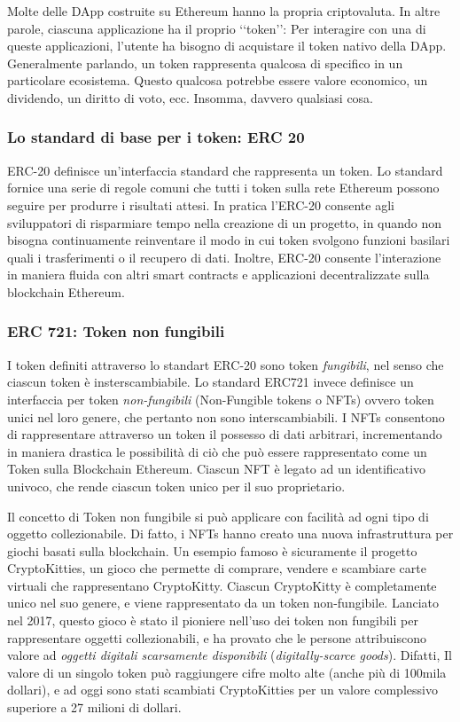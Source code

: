 Molte delle DApp costruite su Ethereum hanno la propria criptovaluta. In altre parole, ciascuna applicazione ha il proprio ‘‘token’’: Per interagire con una di queste applicazioni, l'utente ha bisogno di acquistare il token nativo della DApp. Generalmente parlando, un token rappresenta qualcosa di specifico in un particolare ecosistema. Questo qualcosa potrebbe essere valore economico, un dividendo, un diritto di voto, ecc. Insomma, davvero qualsiasi cosa.

\subsubsection{Lo standard di base per i token: ERC 20}

ERC-20 definisce un’interfaccia standard che rappresenta un token. Lo standard fornice una serie di regole comuni che tutti i token sulla rete Ethereum possono seguire per produrre i risultati attesi. In pratica l'ERC-20 consente agli sviluppatori di risparmiare tempo nella creazione di un progetto, in quando non bisogna continuamente reinventare il modo in cui token svolgono funzioni basilari quali  i trasferimenti o il recupero di dati. Inoltre, ERC-20 consente l'interazione in maniera fluida con altri smart contracts e applicazioni decentralizzate sulla blockchain Ethereum. 

\subsubsection{ERC 721: Token non fungibili}

I token definiti attraverso lo standart ERC-20 sono token \textit{fungibili}, nel senso che ciascun token è insterscambiabile. Lo standard ERC721 invece definisce un interfaccia per token \textit{non-fungibili} (Non-Fungible tokens o NFTs) ovvero token unici nel loro genere, che pertanto non sono interscambiabili. I NFTs consentono di rappresentare attraverso un token il possesso di dati arbitrari, incrementando in maniera drastica le possibilità di ciò che può essere rappresentato come un Token sulla Blockchain Ethereum. Ciascun NFT è legato ad un identificativo univoco, che rende ciascun token unico per il suo proprietario.

Il concetto di Token non fungibile si può applicare con facilità ad ogni tipo di oggetto collezionabile. Di fatto, i NFTs hanno creato una nuova infrastruttura per giochi basati sulla blockchain. Un esempio famoso è sicuramente il progetto CryptoKitties, un gioco che permette di comprare, vendere e scambiare carte virtuali che rappresentano CryptoKitty. Ciascun CryptoKitty è completamente unico nel suo genere, e viene rappresentato da un token non-fungibile. Lanciato nel 2017, questo gioco è stato il pioniere nell'uso dei token non fungibili per rappresentare oggetti collezionabili, e ha provato che le persone attribuiscono valore ad \textit{oggetti digitali scarsamente disponibili} (\textit{digitally-scarce goods}). Difatti, Il valore di un singolo token può raggiungere cifre molto alte (anche più di 100mila dollari), e ad oggi sono stati scambiati CryptoKitties per un valore complessivo superiore a 27 milioni di dollari.

